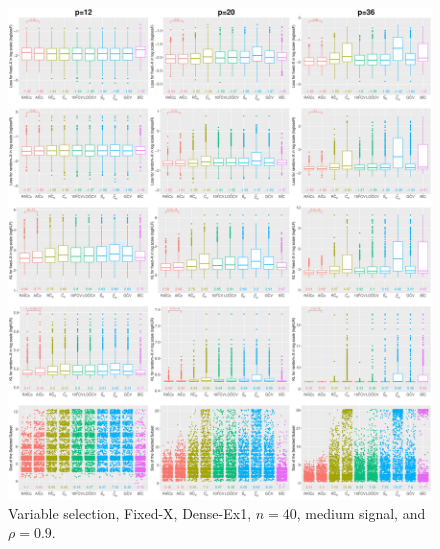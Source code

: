 \begin{figure}[!ht]
\centering
\includegraphics[width=\textwidth]{figures/supplement/fixedx/subset_selection/Dense-Ex1_n40_msnr_rho09.eps}
\caption{Variable selection, Fixed-X, Dense-Ex1, $n=40$, medium signal, and $\rho=0.9$.}
\end{figure}
\clearpage

